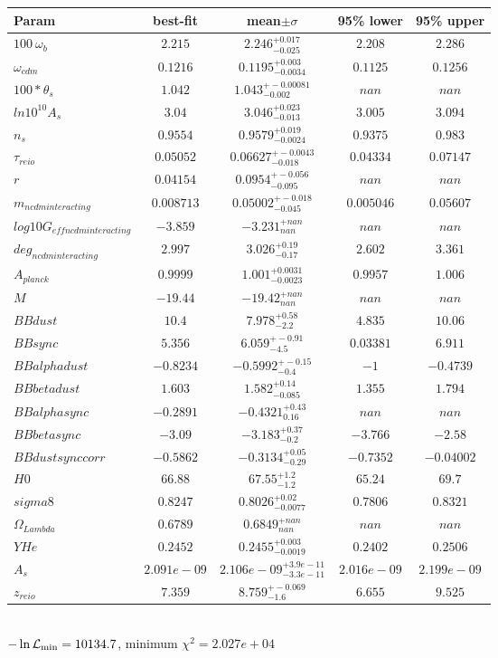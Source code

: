 \begin{tabular}{|l|c|c|c|c|} 
 \hline 
Param & best-fit & mean$\pm\sigma$ & 95\% lower & 95\% upper \\ \hline 
$100~\omega{}_{b }$ &$2.215$ & $2.246_{-0.025}^{+0.017}$ & $2.208$ & $2.286$ \\ 
$\omega{}_{cdm }$ &$0.1216$ & $0.1195_{-0.0034}^{+0.003}$ & $0.1125$ & $0.1256$ \\ 
$100*\theta{}_{s }$ &$1.042$ & $1.043_{-0.002}^{+-0.00081}$ & $nan$ & $nan$ \\ 
$ln10^{10}A_{s }$ &$3.04$ & $3.046_{-0.013}^{+0.023}$ & $3.005$ & $3.094$ \\ 
$n_{s }$ &$0.9554$ & $0.9579_{-0.0024}^{+0.019}$ & $0.9375$ & $0.983$ \\ 
$\tau{}_{reio }$ &$0.05052$ & $0.06627_{-0.018}^{+-0.0043}$ & $0.04334$ & $0.07147$ \\ 
$r$ &$0.04154$ & $0.0954_{-0.095}^{+-0.056}$ & $nan$ & $nan$ \\ 
$m_{ncdm interacting }$ &$0.008713$ & $0.05002_{-0.045}^{+-0.018}$ & $0.005046$ & $0.05607$ \\ 
$log10G_{eff ncdm interacting }$ &$-3.859$ & $-3.231_{nan}^{+nan}$ & $nan$ & $nan$ \\ 
$deg_{ncdm interacting }$ &$2.997$ & $3.026_{-0.17}^{+0.19}$ & $2.602$ & $3.361$ \\ 
$A_{planck }$ &$0.9999$ & $1.001_{-0.0023}^{+0.0031}$ & $0.9957$ & $1.006$ \\ 
$M$ &$-19.44$ & $-19.42_{nan}^{+nan}$ & $nan$ & $nan$ \\ 
$BBdust$ &$10.4$ & $7.978_{-2.2}^{+0.58}$ & $4.835$ & $10.06$ \\ 
$BBsync$ &$5.356$ & $6.059_{-4.5}^{+-0.91}$ & $0.03381$ & $6.911$ \\ 
$BBalphadust$ &$-0.8234$ & $-0.5992_{-0.4}^{+-0.15}$ & $-1$ & $-0.4739$ \\ 
$BBbetadust$ &$1.603$ & $1.582_{-0.085}^{+0.14}$ & $1.355$ & $1.794$ \\ 
$BBalphasync$ &$-0.2891$ & $-0.4321_{0.16}^{+0.43}$ & $nan$ & $nan$ \\ 
$BBbetasync$ &$-3.09$ & $-3.183_{-0.2}^{+0.37}$ & $-3.766$ & $-2.58$ \\ 
$BBdustsynccorr$ &$-0.5862$ & $-0.3134_{-0.29}^{+0.05}$ & $-0.7352$ & $-0.04002$ \\ 
$H0$ &$66.88$ & $67.55_{-1.2}^{+1.2}$ & $65.24$ & $69.7$ \\ 
$sigma8$ &$0.8247$ & $0.8026_{-0.0077}^{+0.02}$ & $0.7806$ & $0.8321$ \\ 
$\Omega{}_{Lambda }$ &$0.6789$ & $0.6849_{nan}^{+nan}$ & $nan$ & $nan$ \\ 
$YHe$ &$0.2452$ & $0.2455_{-0.0019}^{+0.003}$ & $0.2402$ & $0.2506$ \\ 
$A_{s }$ &$2.091e-09$ & $2.106e-09_{-3.3e-11}^{+3.9e-11}$ & $2.016e-09$ & $2.199e-09$ \\ 
$z_{reio }$ &$7.359$ & $8.759_{-1.6}^{+-0.069}$ & $6.655$ & $9.525$ \\ 
\hline 
 \end{tabular} \\ 
$-\ln{\cal L}_\mathrm{min} =10134.7$, minimum $\chi^2=2.027e+04$ \\ 
